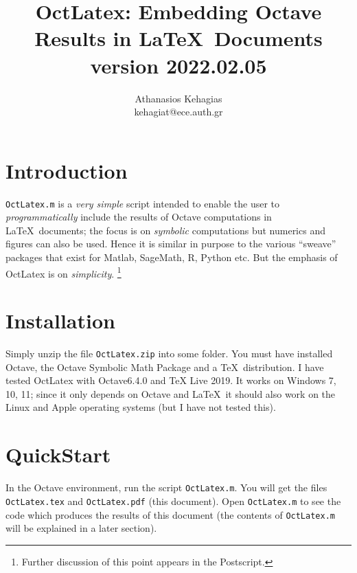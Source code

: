 \documentclass{article}
\title{\textsf{OctLatex}: Embedding \textsf{Octave} Results in \LaTeX\ Documents\\ {\small version 2022.02.05}}
\author{Athanasios Kehagias\\kehagiat@ece.auth.gr}
\begin{document}
 \maketitle
 \section{Introduction}
 \texttt{OctLatex.m} is a \emph{very simple} script intended to enable the user to \emph{programmatically} 
 include the results of \textsf{Octave} computations in \LaTeX\  documents;
 the focus is on \emph{symbolic} computations but numerics and figures can also be used. 
 Hence it is similar in purpose to the various ``sweave'' packages that exist for \textsf{Matlab}, 
 \textsf{SageMath}, \textsf{R}, \textsf{Python} etc. But the emphasis of \textsf{OctLatex} is on \emph{simplicity}.
 \footnote{Further discussion of this point appears in the Postscript.}

 \section{Installation}
 Simply unzip the file \texttt{OctLatex.zip} into some folder. You must have installed \textsf{Octave}, 
 the  \textsf{Octave Symbolic Math Package} and a \TeX\  distribution. 
 I have tested \textsf{OctLatex} with \textsf{Octave6.4.0} and \textsf{TeX Live 2019}.
 It works on \textsf{Windows 7, 10, 11}; since it only depends on \textsf{Octave} and \LaTeX\,
 it should also work on the \textsf{Linux} and \textsf{Apple} operating systems
 (but I have not tested this).
 
 \section{QuickStart}
 In the \textsf{Octave} environment, run the script \texttt{OctLatex.m}. 
 You will get the files \texttt{OctLatex.tex} and \texttt{OctLatex.pdf} (this document).
 Open \texttt{OctLatex.m} to see the code which produces the results of this document
 (the contents of \texttt{OctLatex.m} will be explained in a later section).
 
\end{document}
